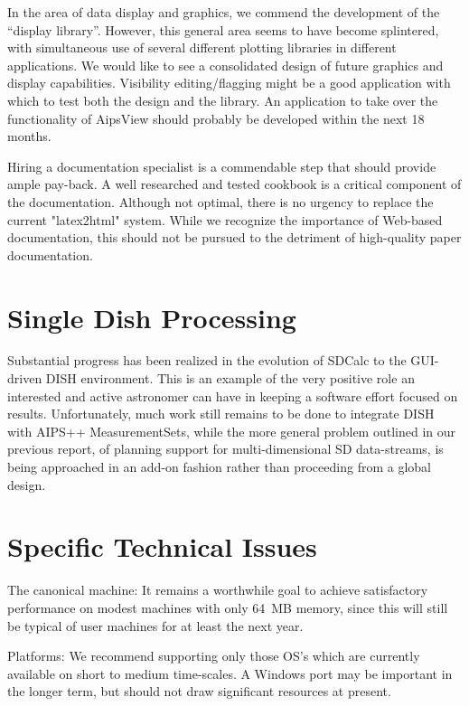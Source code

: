 In the area of data display and graphics, we commend the development
of the ``display library''. However, this general area seems to have
become splintered, with simultaneous use of several different plotting
libraries in different applications.  We would like to see a
consolidated design of future graphics and display capabilities.
Visibility editing/flagging might be a good application with which to
test both the design and the library.  An application to take over the
functionality of AipsView should probably be developed within the next
18 months.

Hiring a documentation specialist is a commendable step that should
provide ample pay-back.  A well researched and tested cookbook is a
critical component of the documentation. Although not optimal, there is
no urgency to replace the current "latex2html" system. While we
recognize the importance of Web-based documentation, this should not
be pursued to the detriment of high-quality paper documentation.

\section{Single Dish Processing}

Substantial progress has been realized in the evolution of SDCalc to
the GUI-driven DISH environment. This is an example of the very
positive role an interested and active astronomer can have in keeping
a software effort focused on results. Unfortunately, much work still
remains to be done to integrate DISH with AIPS++ MeasurementSets,
while the more general problem outlined in our previous report, of
planning support for multi-dimensional SD data-streams, is being
approached in an add-on fashion rather than proceeding from a global
design.

\section{Specific Technical Issues}

The canonical machine: It remains a worthwhile goal to achieve
satisfactory performance on modest machines with only 64~MB memory,
since this will still be typical of user machines for at least the
next year.

Platforms: We recommend supporting only those OS's which are currently
available on short to medium time-scales.  A Windows port may be
important in the longer term, but should not draw significant
resources at present.


